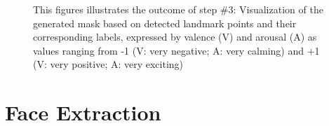\begin{figure}[H]
  \hfill
  \caption[ER pipeline step \#3: Mask]{This figures illustrates the outcome of step \#3: Visualization of the generated mask based on detected landmark points and their corresponding labels, expressed by valence (V) and arousal (A) as values ranging from -1 (V: very negative; A: very calming) and +1 (V: very positive; A: very exciting)}
  \label{fig:MethodologyMask}
\end{figure}


\section{Face Extraction}

